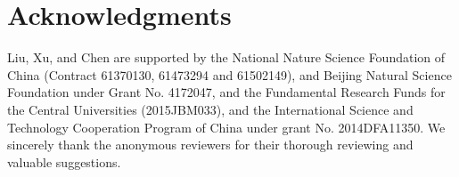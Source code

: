 \documentclass[11pt,a4paper]{article}
\begin{document}
\section*{Acknowledgments}
Liu, Xu, and Chen are supported by the National Nature Science Foundation of China (Contract 61370130, 61473294 and 61502149), and Beijing Natural Science Foundation under Grant No. 4172047, and the Fundamental Research Funds for the Central Universities (2015JBM033), and the International Science and Technology Cooperation Program of China under grant No. 2014DFA11350.
We sincerely thank the anonymous reviewers for their thorough reviewing and valuable suggestions.



\end{document}
